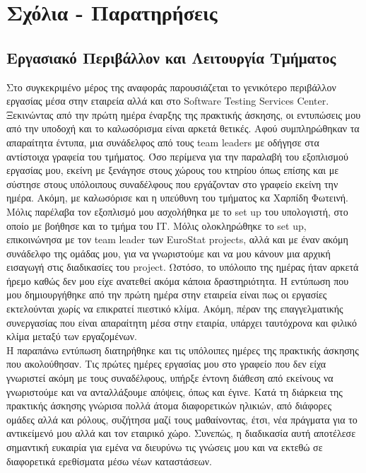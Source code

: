\chapter{Σχόλια - Παρατηρήσεις}

\section{Εργασιακό Περιβάλλον και Λειτουργία Τμήματος}
Στο συγκεκριμένο μέρος της αναφοράς παρουσιάζεται το γενικότερο περιβάλλον εργασίας μέσα στην εταιρεία αλλά και στο Software Testing 
Services Center. Ξεκινώντας από την πρώτη ημέρα έναρξης της πρακτικής άσκησης, οι εντυπώσεις μου από την υποδοχή και το καλωσόρισμα είναι 
αρκετά θετικές. Αφού συμπληρώθηκαν τα απαραίτητα έντυπα, μια συνάδελφος από τους team leaders με οδήγησε στα αντίστοιχα γραφεία του τμήματος. 
Όσο περίμενα για την παραλαβή του εξοπλισμού εργασίας μου, εκείνη με ξενάγησε στους χώρους του κτηρίου όπως επίσης και με σύστησε στους υπόλοιπους 
συναδέλφους που εργάζονταν στο γραφείο εκείνη την ημέρα. Ακόμη, με καλωσόρισε και η υπεύθυνη του τμήματος κα Χαρπίδη Φωτεινή. 
Μόλις παρέλαβα τον εξοπλισμό μου ασχολήθηκα με το set up του υπολογιστή, στο οποίο με βοήθησε 
και το τμήμα του ΙΤ. Μόλις ολοκληρώθηκε το set up, επικοινώνησα με τον team leader των EuroStat projects, αλλά και με έναν 
ακόμη συνάδελφο της ομάδας μου, για να γνωριστούμε και να μου κάνουν μια αρχική εισαγωγή στις διαδικασίες του project. Ωστόσο, το υπόλοιπο της ημέρας ήταν αρκετά ήρεμο 
καθώς δεν μου είχε ανατεθεί ακόμα κάποια δραστηριότητα. Η εντύπωση που μου δημιουργήθηκε από την πρώτη ημέρα στην εταιρεία είναι πως οι εργασίες εκτελούνται χωρίς να επικρατεί 
πιεστικό κλίμα. Ακόμη, πέραν της επαγγελματικής συνεργασίας που είναι απαραίτητη μέσα στην εταιρία, υπάρχει ταυτόχρονα και φιλικό κλίμα μεταξύ των εργαζομένων.\\

Η παραπάνω εντύπωση διατηρήθηκε και τις υπόλοιπες ημέρες της πρακτικής άσκησης που ακολούθησαν. Τις πρώτες ημέρες εργασίας μου στο γραφείο που δεν είχα γνωριστεί ακόμη με τους συναδέλφους, 
υπήρξε έντονη διάθεση από εκείνους να γνωριστούμε και να ανταλλάξουμε απόψεις, όπως και έγινε. Κατά τη διάρκεια της πρακτικής άσκησης γνώρισα πολλά άτομα διαφορετικών ηλικιών, από διάφορες ομάδες αλλά και ρόλους, 
συζήτησα μαζί τους μαθαίνοντας, έτσι, νέα πράγματα για το αντικείμενό μου αλλά και τον εταιρικό χώρο. Συνεπώς, η διαδικασία αυτή αποτέλεσε σημαντική ευκαιρία για εμένα να διευρύνω τις γνώσεις μου και 
να εκτεθώ σε διαφορετικά ερεθίσματα μέσω νέων καταστάσεων.\\

